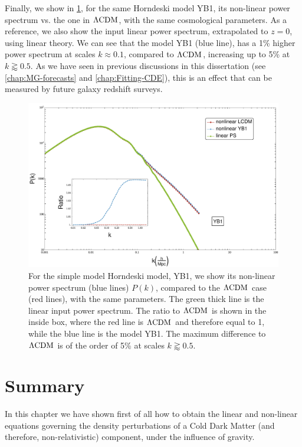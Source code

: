 Finally, we show in \cref{fig:change-PS-resummed-YB1}, for the same Horndeski model YB1, its non-linear power spectrum vs. the one in $\Lambda\mathrm{CDM}$,
with the same cosmological parameters. As a reference, we also show the input linear power spectrum, extrapolated to $z=0$,
using linear theory. We can see that the model YB1 (blue line), has a 1\%
higher power spectrum at scales $k \approx 0.1$, compared to $\Lambda\mathrm{CDM}$, increasing up to 5\% at $k \gtrapprox 0.5$.
As we have seen in previous discussions in this dissertation (see \cref{chap:MG-forecasts} and \cref{chap:Fitting-CDE}), this is an effect that can be measured by future galaxy redshift surveys.
\begin{figure}[tbph]
	\centering
	\includegraphics[width=0.9\linewidth]{Chapters/resummation-plots/PS-Resummation-YB1-vs-LCDM.pdf}
	\caption[$f \sigma_{8}$ in Horndeski.]{For the simple model Horndeski model, YB1,
		we show its non-linear power spectrum (blue lines) $P(k)$, compared to the $\Lambda\mathrm{CDM}$ case (red lines), with the same parameters.
		The green thick line is the linear input power spectrum. The ratio to $\Lambda\mathrm{CDM}$ is shown in the inside box, where the red line is $\Lambda\mathrm{CDM}$ and therefore
		equal to 1, while the blue line is the model YB1. The maximum difference to $\Lambda\mathrm{CDM}$ is of the order of 5\% at scales $k \gtrapprox 0.5$.}
	\label{fig:change-PS-resummed-YB1}
\end{figure}

\section{Summary}

In this chapter we have shown first of all how to obtain the linear and non-linear equations
governing the density perturbations of a Cold Dark Matter (and therefore, non-relativistic) component, 
under the influence of gravity.

